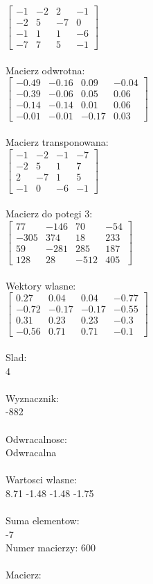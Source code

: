 \documentclass[a4paper,12pt]{article}
\begin{document}
$\begin{bmatrix} -1&-2&2&-1\\-2&5&-7&0\\-1&1&1&-6\\-7&7&5&-1 \end{bmatrix}$
\\
\\
Macierz odwrotna:\\

$\begin{bmatrix} -0.49&-0.16&0.09&-0.04\\-0.39&-0.06&0.05&0.06\\-0.14&-0.14&0.01&0.06\\-0.01&-0.01&-0.17&0.03 \end{bmatrix}$
\\
\\
Macierz transponowana:\\

$\begin{bmatrix} -1&-2&-1&-7\\-2&5&1&7\\2&-7&1&5\\-1&0&-6&-1 \end{bmatrix}$
\\
\\
Macierz do potegi 3:\\

$\begin{bmatrix} 77&-146&70&-54\\-305&374&18&233\\59&-281&285&187\\128&28&-512&405 \end{bmatrix}$
\\
\\
Wektory wlasne:\\

$\begin{bmatrix} 0.27&0.04&0.04&-0.77\\-0.72&-0.17&-0.17&-0.55\\0.31&0.23&0.23&-0.3\\-0.56&0.71&0.71&-0.1 \end{bmatrix}$
\\
\\
Slad:\\
4
\\
\\
Wyznacznik:\\
-882
\\
\\
Odwracalnosc:\\
Odwracalna
\\
\\
Wartosci wlasne:\\
8.71 -1.48 -1.48 -1.75
\\
\\
Suma elementow:\\
-7
\\
\newpage
Numer macierzy:
600
\\
\\
Macierz:\\
\end{document}
